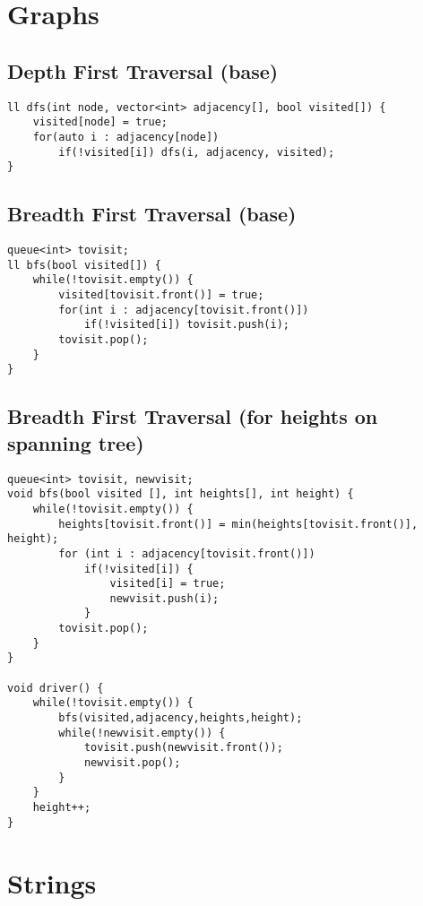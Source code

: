 \documentclass{article}
\begin{document}
    \section{Graphs}
        \subsection{Depth First Traversal (base)}


        \begin{lstlisting}
ll dfs(int node, vector<int> adjacency[], bool visited[]) {
    visited[node] = true;
    for(auto i : adjacency[node])
        if(!visited[i]) dfs(i, adjacency, visited);
}       \end{lstlisting}


        \subsection{Breadth First Traversal (base)}


        \begin{lstlisting}
queue<int> tovisit;
ll bfs(bool visited[]) {
    while(!tovisit.empty()) {
        visited[tovisit.front()] = true;
        for(int i : adjacency[tovisit.front()])
            if(!visited[i]) tovisit.push(i);
        tovisit.pop();
    }
}       \end{lstlisting}
        
        \subsection{Breadth First Traversal (for heights on spanning tree)}

        
        \begin{lstlisting}
queue<int> tovisit, newvisit;
void bfs(bool visited [], int heights[], int height) {
    while(!tovisit.empty()) {
        heights[tovisit.front()] = min(heights[tovisit.front()], height);
        for (int i : adjacency[tovisit.front()])
            if(!visited[i]) {
                visited[i] = true;
                newvisit.push(i);
            }
        tovisit.pop();
    }
}

void driver() {
    while(!tovisit.empty()) {
        bfs(visited,adjacency,heights,height);
        while(!newvisit.empty()) {
            tovisit.push(newvisit.front());
            newvisit.pop();
        }
    }
    height++;
}\end{lstlisting}
    \section{Strings}
\end{document}
